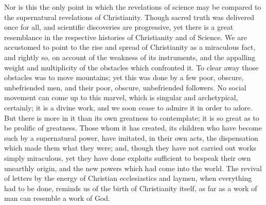Nor is this the only point in
which the revelations of science may be compared to the supernatural
revelations of Christianity. Though sacred truth was delivered
once for all, and scientific discoveries are progressive, yet there is
a great resemblance in the respective histories of Christianity and of
Science. We are accustomed to point to the rise and spread of
Christianity as a miraculous fact, and rightly so, on account of the
weakness of its instruments, and the appalling weight and multiplicity
of the obstacles which confronted it. To clear away those obstacles
was to move mountains; yet this was done by a few poor, obscure,
unbefriended men, and their poor, obscure, unbefriended followers. No
social movement can come up to this marvel, which is singular and
archetypical, certainly; it is a divine work, and we soon cease to
admire it in order to adore. But there is more in it than its own
greatness to contemplate; it is so great as to be prolific of
greatness. Those whom it has created, its children who have become
such by a supernatural power, have imitated, in their own acts, the
dispensation which made them what they were; and, though they have not
carried out works simply miraculous, yet they have done exploits
sufficient to bespeak their own unearthly origin, and the new powers
which had come into the world. The revival of letters by the energy of
Christian ecclesiastics and laymen, when everything had to be done,
reminds us of the birth of Christianity itself, as far as a work of
man can resemble a work of God.

